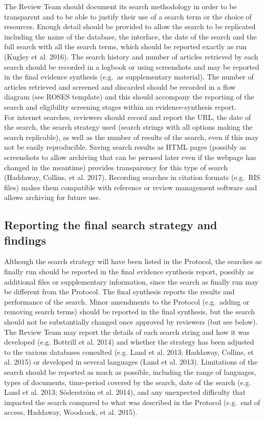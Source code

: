 \documentclass[
  letterpaper,
  DIV=11,
  numbers=noendperiod]{scrreprt}
\begin{document}
The Review Team should document its search methodology in order to be
transparent and to be able to justify their use of a search term or the
choice of resources. Enough detail should be provided to allow the
search to be replicated including the name of the database, the
interface, the date of the search and the full search with all the
search terms, which should be reported exactly as run (Kugley et al.
2016). The search history and number of articles retrieved by each
search should be recorded in a logbook or using screenshots and may be
reported in the final evidence synthesis (e.g.~as supplementary
material). The number of articles retrieved and screened and discarded
should be recorded in a flow diagram (see ROSES template) and this
should accompany the reporting of the search and eligibility screening
stages within an evidence-synthesis report.\\
For internet searches, reviewers should record and report the URL, the
date of the search, the search strategy used (search strings with all
options making the search replicable), as well as the number of results
of the search, even if this may not be easily reproducible. Saving
search results as HTML pages (possibly as screenshots to allow archiving
that can be perused later even if the webpage has changed in the
meantime) provides transparency for this type of search (Haddaway,
Collins, et al. 2017). Recording searches in citation formats (e.g.~RIS
files) makes them compatible with reference or review management
software and allows archiving for future use.

\subsection{Reporting the final search strategy and
findings}\label{reporting-the-final-search-strategy-and-findings}

Although the search strategy will have been listed in the Protocol, the
searches as finally run should be reported in the final evidence
synthesis report, possibly as additional files or supplementary
information, since the search as finally run may be different from the
Protocol. The final synthesis reports the results and performance of the
search. Minor amendments to the Protocol (e.g.~adding or removing search
terms) should be reported in the final synthesis, but the search should
not be substantially changed once approved by reviewers (but see
below).\\
The Review Team may report the details of each search string and how it
was developed (e.g. Bottrill et al. 2014) and whether the strategy has
been adjusted to the various databases consulted (e.g. Land et al. 2013;
Haddaway, Collins, et al. 2015) or developed in several languages (Land
et al. 2013). Limitations of the search should be reported as much as
possible, including the range of languages, types of documents,
time-period covered by the search, date of the search (e.g. Land et al.
2013; Söderström et al. 2014), and any unexpected difficulty that
impacted the search compared to what was described in the Protocol
(e.g.~end of access, Haddaway, Woodcock, et al. 2015).
\end{document}
